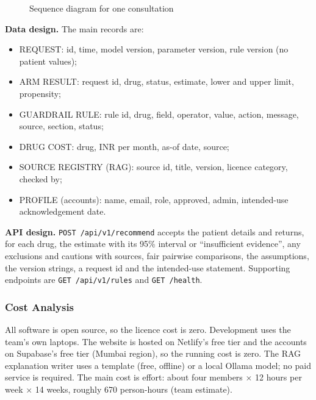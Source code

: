 \begin{figure}[H]\centering
{}\caption{Sequence diagram for one consultation}\label{fig:seq}\end{figure}

\textbf{Data design.} The main records are:
\begin{itemize}
\item REQUEST: id, time, model version, parameter version, rule version (no patient values);
\item ARM RESULT: request id, drug, status, estimate, lower and upper limit, propensity;
\item GUARDRAIL RULE: rule id, drug, field, operator, value, action, message, source, section, status;
\item DRUG COST: drug, INR per month, as-of date, source;
\item SOURCE REGISTRY (RAG): source id, title, version, licence category, checked by;
\item PROFILE (accounts): name, email, role, approved, admin, intended-use acknowledgement date.
\end{itemize}
\textbf{API design.} \texttt{POST /api/v1/recommend} accepts the patient details and returns, for each drug, the estimate with its 95\% interval or ``insufficient evidence'', any exclusions and cautions with sources, fair pairwise comparisons, the assumptions, the version strings, a request id and the intended-use statement. Supporting endpoints are \texttt{GET /api/v1/rules} and \texttt{GET /health}.

\subsubsection{Cost Analysis}
All software is open source, so the licence cost is zero. Development uses the team's own laptops. The website is hosted on Netlify's free tier and the accounts on Supabase's free tier (Mumbai region), so the running cost is zero. The RAG explanation writer uses a template (free, offline) or a local Ollama model; no paid service is required. The main cost is effort: about four members $\times$ 12 hours per week $\times$ 14 weeks, roughly 670 person-hours (team estimate).

